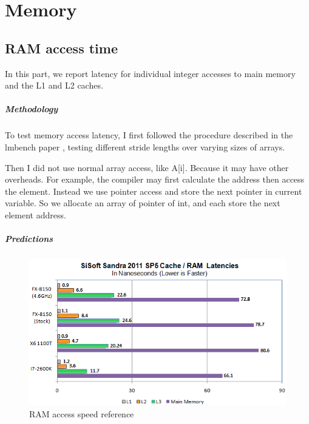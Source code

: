 \chapter{Memory}

\section{RAM access time}
In this part, we report latency for individual integer accesses to main memory and the L1 and L2 caches.

\paragraph{Methodology}
To test memory access latency, I first followed the procedure described in the lmbench paper \cite{ramacc}, testing different stride lengths over varying sizes of arrays. 

Then I did not use normal array access, like A[i]. Because it may have other overheads. For example, the compiler may first calculate the address then access the element. Instead we use pointer access and store the next pointer in current variable. So we allocate an array of pointer of int, and each store the next element address.

\paragraph{Predictions}

\pagebreak

\begin {figure}
\centering
\includegraphics[width=6in]{./pics/Sandra-Latency.png}
\caption{RAM access speed reference}\label{RAM access speed reference}
\end{figure}

